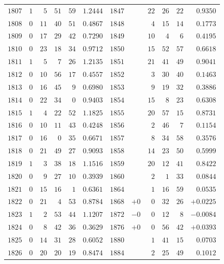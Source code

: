 \begin{center}
{{\begin{minipage}{.96\linewidth}
\begin{tabular}{r|rrrr|r||r|rrrr|r}
$1807$ & $1$ & $5$ & $51$ & $59$ & $1.2444$ & $1847$ &  & $22$ & $26$ & $22$ & $0.9350$\\
$1808$ & $0$ & $11$ & $40$ & $51$ & $0.4867$ & $1848$ &  & $4$ & $15$ & $14$ & $0.1773$\\
$1809$ & $0$ & $17$ & $29$ & $42$ & $0.7290$ & $1849$ &  & $10$ & $4$ & $6$ & $0.4195$\\
$1810$ & $0$ & $23$ & $18$ & $34$ & $0.9712$ & $1850$ &  & $15$ & $52$ & $57$ & $0.6618$\\[3pt]
$1811$ & $1$ & $5$ & $7$ & $26$ & $1.2135$ & $1851$ &  & $21$ & $41$ & $49$ & $0.9041$\\
$1812$ & $0$ & $10$ & $56$ & $17$ & $0.4557$ & $1852$ &  & $3$ & $30$ & $40$ & $0.1463$\\
$1813$ & $0$ & $16$ & $45$ & $9$ & $0.6980$ & $1853$ &  & $9$ & $19$ & $32$ & $0.3886$\\
$1814$ & $0$ & $22$ & $34$ & $0$ & $0.9403$ & $1854$ &  & $15$ & $8$ & $23$ & $0.6308$\\
$1815$ & $1$ & $4$ & $22$ & $52$ & $1.1825$ & $1855$ &  & $20$ & $57$ & $15$ & $0.8731$\\[3pt]
$1816$ & $0$ & $10$ & $11$ & $43$ & $0.4248$ & $1856$ &  & $2$ & $46$ & $7$ & $0.1154$\\
$1817$ & $0$ & $16$ & $0$ & $35$ & $0.6671$ & $1857$ &  & $8$ & $34$ & $58$ & $0.3576$\\
$1818$ & $0$ & $21$ & $49$ & $27$ & $0.9093$ & $1858$ &  & $14$ & $23$ & $50$ & $0.5999$\\
$1819$ & $1$ & $3$ & $38$ & $18$ & $1.1516$ & $1859$ &  & $20$ & $12$ & $41$ & $0.8422$\\
$1820$ & $0$ & $9$ & $27$ & $10$ & $0.3939$ & $1860$ &  & $2$ & $1$ & $33$ & $0.0844$\\[3pt]
$1821$ & $0$ & $15$ & $16$ & $1$ & $0.6361$ & $1864$ &  & $1$ & $16$ & $59$ & $0.0535$\\
$1822$ & $0$ & $21$ & $4$ & $53$ & $0.8784$ & $1868$ & $+0$ & $0$ & $32$ & $26$ & $+0.0225$\\
$1823$ & $1$ & $2$ & $53$ & $44$ & $1.1207$ & $1872$ & $-0$ & $0$ & $12$ & $8$ & $-0.0084$\\
$1824$ & $0$ & $8$ & $42$ & $36$ & $0.3629$ & $1876$ & $+0$ & $0$ & $56$ & $42$ & $+0.0393$\\
$1825$ & $0$ & $14$ & $31$ & $28$ & $0.6052$ & $1880$ &  & $1$ & $41$ & $15$ & $0.0703$\\[3pt]
$1826$ & $0$ & $20$ & $20$ & $19$ & $0.8474$ & $1884$ &  & $2$ & $25$ & $49$ & $0.1012$\\

\end{tabular}
\end{minipage}}}
\end{center}
